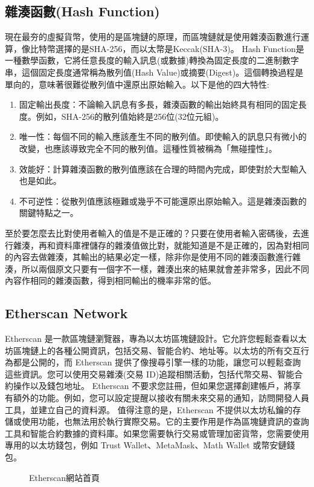 \documentclass[12pt, a4paper]{article}
\begin{document}
\subsection{雜湊函數(Hash Function)}
現在最夯的虛擬貨幣，使用的是區塊鏈的原理，而區塊鏈就是使用雜湊函數進行運算，像比特幣選擇的是SHA-256，而以太幣是Keccak(SHA-3)。
Hash Function是一種數學函數，它將任意長度的輸入訊息(或數據)轉換為固定長度的二進制數字串，這個固定長度通常稱為散列值(Hash Value)或摘要(Digest)。這個轉換過程是單向的，意味著很難從散列值中還原出原始輸入。以下是他的四大特性:
\begin{enumerate}
\item 固定輸出長度：不論輸入訊息有多長，雜湊函數的輸出始終具有相同的固定長度。例如，SHA-256的散列值始終是256位(32位元組)。
\item 唯一性：每個不同的輸入應該產生不同的散列值。即使輸入的訊息只有微小的改變，也應該導致完全不同的散列值。這種性質被稱為「無碰撞性」。
\item 效能好：計算雜湊函數的散列值應該在合理的時間內完成，即使對於大型輸入也是如此。
\item 不可逆性：從散列值應該極難或幾乎不可能還原出原始輸入。這是雜湊函數的關鍵特點之一。
\end{enumerate}
至於要怎麼去比對使用者輸入的值是不是正確的？只要在使用者輸入密碼後，去進行雜湊，再和資料庫裡儲存的雜湊值做比對，就能知道是不是正確的，因為對相同的內容去做雜湊，其輸出的結果必定一樣，除非你是使用不同的雜湊函數進行雜湊，所以兩個原文只要有一個字不一樣，雜湊出來的結果就會差非常多，因此不同內容作相同的雜湊函數，得到相同輸出的機率非常的低。
\subsection{Etherscan Network}
Etherscan 是一款區塊鏈瀏覽器，專為以太坊區塊鏈設計。它允許您輕鬆查看以太坊區塊鏈上的各種公開資訊，包括交易、智能合約、地址等。以太坊的所有交互行為都是公開的，而 Etherscan 提供了像搜尋引擎一樣的功能，讓您可以輕鬆查詢這些資訊。您可以使用交易雜湊(交易 ID)追蹤相關活動，包括代幣交易、智能合約操作以及錢包地址。
Etherscan 不要求您註冊，但如果您選擇創建帳戶，將享有額外的功能。例如，您可以設定提醒以接收有關未來交易的通知，訪問開發人員工具，並建立自己的資料源。
值得注意的是，Etherscan 不提供以太坊私鑰的存儲或使用功能，也無法用於執行實際交易。它的主要作用是作為區塊鏈資訊的查詢工具和智能合約數據的資料庫。如果您需要執行交易或管理加密貨幣，您需要使用專用的以太坊錢包，例如 Trust Wallet、MetaMask、Math Wallet 或幣安鏈錢包。
\begin{figure}[h]
    \caption{Etherscan網站首頁}
    \label{fig:Etherscan}
\end{figure}
\end{document}
